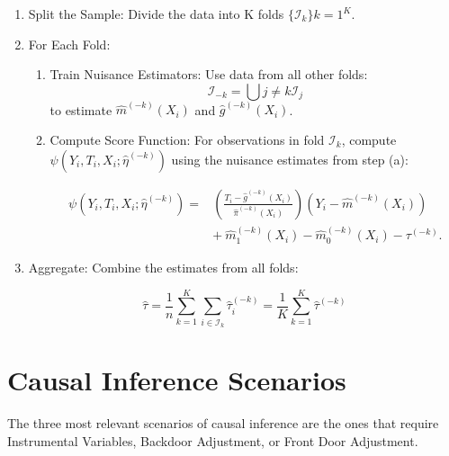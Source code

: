 \documentclass{article}
\numberwithin{equation}{section}
\begin{document}
\begin{enumerate}
\item Split the Sample: Divide the data into K folds $\{\mathcal{I}_k\}{k=1}^K$.
\item For Each Fold:
\begin{enumerate}
\item Train Nuisance Estimators: Use data from all other folds:
$$
\mathcal{I}_{-k} = \bigcup{j \neq k} \mathcal{I}_j
$$
to estimate $\hat{m}^{(-k)}(X_i)$ and $\hat{g}^{(-k)}(X_i)$.

\item Compute Score Function: For observations in fold $\mathcal{I}_k$, compute $\psi(Y_i, T_i, X_i; \hat{\eta}^{(-k)})$ using the nuisance estimates from step (a):

\begin{equation}
    \begin{split}
        \psi(Y_i, T_i, X_i; \hat{\eta}^{(-k)}) = & \left( \frac{T_i - \hat{g}^{(-k)}(X_i)}{\hat{\pi}^{(-k)}(X_i)} \right) (Y_i - \hat{m}^{(-k)}(X_i)) \\
        & + \ \hat{m}_1^{(-k)}(X_i) - \hat{m}_0^{(-k)}(X_i) - \tau^{(-k)}.
    \end{split}
    \label{eq:orthogonal_score_fold_k}
\end{equation}

\end{enumerate}
\item Aggregate: Combine the estimates from all folds:

\begin{equation}
\hat{\tau} = \frac{1}{n} \sum_{k=1}^K \sum_{i \in \mathcal{I}_k} \hat{\tau}_i^{(-k)} =  \frac{1}{K} \sum_{k=1}^K \hat{\tau}^{(-k)}
\label{eq:avg_tau_hat}
\end{equation}

\end{enumerate}

\section{Causal Inference Scenarios}

The three most relevant scenarios of causal inference are the ones that require Instrumental Variables, Backdoor Adjustment, or Front Door Adjustment.
\end{document}
